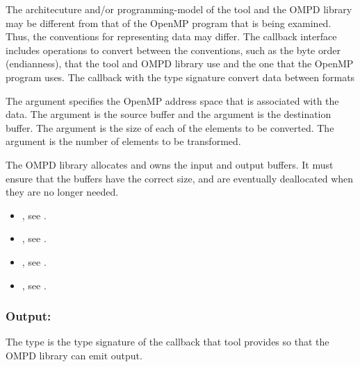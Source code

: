 \descr
The architecuture and/or programming-model of the tool and the OMPD library 
may be different from that of the OpenMP program that is being examined. Thus,
the conventions for representing data may differ. The callback interface includes 
operations to convert between the conventions, such as the byte order (endianness),
that the tool and OMPD library use and the one that the OpenMP program uses.
The callback with the  type signature 
convert data between formats

\argdesc
The  argument specifies the OpenMP address space 
that is associated with the data. The  argument is the source buffer
and the  argument is the destination buffer. The  
argument is the size of each of the elements to be converted. The  
argument is the number of elements to be transformed.


The OMPD library allocates and owns the input and output buffers. It must
ensure that the buffers have the correct size, and are eventually deallocated 
when they are no longer needed.

\crossreferences
\begin{itemize}
\item {}, see .

\item {}, 
see .

\item {}, see .

\item {}, see .
\end{itemize}



\subsubsection{Output: }
\label{subsubsec:output}
\label{subsubsubsec:ompd_callback_print_string_fn_t}

\summary
The  type is the type signature of the 
callback that tool provides so that the OMPD library can emit output.

